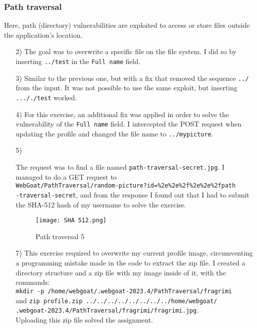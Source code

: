 \documentclass{article}
\begin{document}
\subsubsection{Path traversal}
Here, path (directory) vulnerabilities are exploited to access or store files outside the application's location.
\begin{itemize}
    \item[2)] {The goal was to overwrite a specific file on the file system.
    I did so by inserting \texttt{../test} in the \texttt{Full name} field.}
    
    \item[3)] {Similar to the previous one, but with a fix that removed the sequence \texttt{../} from the input.
    It was not possible to use the same exploit, but inserting \texttt{..././test} worked.}
    
    \item[4)] {For this exercise, an additional fix was applied in order to solve the vulnerability of the \texttt{Full name} field.
    I intercepted the POST request when updating the profile and changed the file name to \texttt{../mypicture}.}
    
    \item[5)] {The request was to find a file named \texttt{path-traversal-secret.jpg}.
    I managed to do a GET request to\\\texttt{WebGoat/PathTraversal/random-picture?id=\%2e\%2e\%2f\%2e\%2e\%2fpath\\-traversal-secret}, and from the response I found out that I had to submit the SHA-512 hash of my username to solve the exercise.
    \begin{figure}[H]
        \centering
        \texttt{[image: SHA 512.png]}
        \caption{Path traversal 5}
        \label{fig:SHA-512}
    \end{figure}
    }
    
    \item[7)] {This exercise required to overwrite my current profile image, circumventing a programming mistake made in the code to extract the zip file.
    I created a directory structure and a zip file with my image inside of it, with the commands:\\
    \texttt{mkdir -p /home/webgoat/.webgoat-2023.4/PathTraversal/fragrimi}\\and \texttt{zip profile.zip ../../../../../../../../home/webgoat/\\.webgoat-2023.4/PathTraversal/fragrimi/fragrimi.jpg}.\\
    Uploading this zip file solved the assignment.}
\end{itemize}
\end{document}
